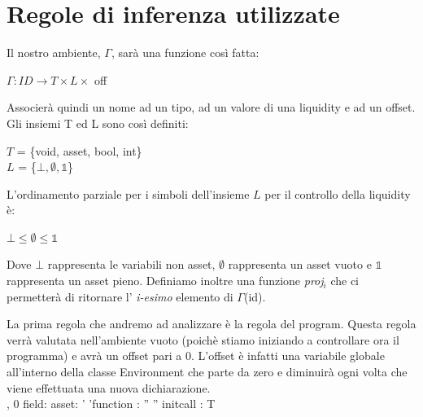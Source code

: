 \documentclass[12pt, a4paper]{report}
\begin{document}
\section{Regole di inferenza utilizzate}
Il nostro ambiente, $\Gamma$, sarà una funzione così fatta:
\begin{center}
    $\Gamma : ID \rightarrow T \times L \times$ off
\end{center}
Associerà quindi un nome ad un tipo, ad un valore di una liquidity e ad un offset. Gli insiemi T ed L sono così definiti: 
\begin{center}
    $T$ = \{void, asset, bool, int\}\\
    $L$ = \{$\bot, \emptyset,  \mathds{1}$\}
\end{center}
L'ordinamento parziale per i simboli dell'insieme $L$ per il controllo della liquidity è: 
\begin{center}
    $\bot \leq \emptyset \leq  \mathds{1}$
\end{center} 
Dove $\bot$ rappresenta le variabili non asset, $\emptyset$ rappresenta un asset vuoto e $ \mathds{1}$ rappresenta un asset pieno. 
Definiamo inoltre una funzione \emph{proj$_i$} che ci permetterà di ritornare l' \emph{i-esimo} elemento di $\Gamma$(id).

La prima regola che andremo ad analizzare è la regola del program. Questa regola verrà valutata nell'ambiente vuoto (poichè stiamo iniziando a controllare ora il programma) e avrà un offset pari a 0. L'offset è infatti una variabile globale all'interno della classe Environment che parte da zero e diminuirà ogni volta che viene effettuata una nuova dichiarazione. \\
    
    {\emptyset, 0 \vdash field: \Gamma \; \Gamma \vdash asset: \Gamma' \;\Gamma'\vdash function : \Gamma'' \; \Gamma'' \vdash initcall : T}
\end{document}
